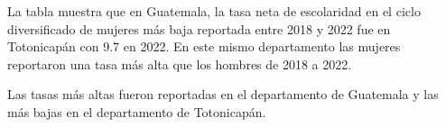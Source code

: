 La tabla muestra que en Guatemala, la tasa neta de escolaridad en el ciclo diversificado de mujeres más baja reportada entre 2018 y 2022 fue en Totonicapán con 9.7 en 2022. En este mismo departamento las mujeres reportaron una tasa más alta que los hombres de 2018 a 2022. 

Las tasas más altas fueron reportadas en el departamento de Guatemala y las más bajas en el departamento de Totonicapán.